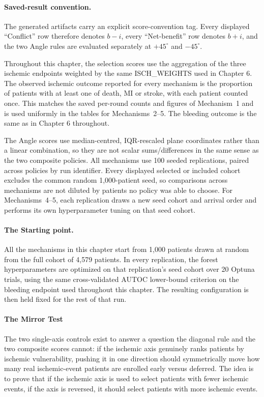 \paragraph{Saved-result convention.}
The generated artifacts carry an explicit score-convention tag. Every displayed
``Conflict'' row therefore denotes $b-i$, every ``Net-benefit'' row denotes $b+i$, and
the two Angle rules are evaluated separately at $+45^\circ$ and $-45^\circ$.

Throughout this chapter, the selection scores use the aggregation of the three
ischemic endpoints weighted by the same ISCH\_WEIGHTS used in Chapter 6. The observed
ischemic outcome reported for every mechanism is the proportion of patients with at
least one of death, MI or stroke, with each patient counted once. This matches the saved
per-round counts and figures of Mechanism~1 and is used uniformly in the tables for
Mechanisms~2--5. The bleeding outcome is the same as in Chapter 6 throughout.

\vspace{10pt}

The Angle scores use median-centred, IQR-rescaled plane coordinates rather than a
linear combination, so they are not scalar sums/differences in the same sense as the two
composite policies.
All mechanisms use 100 seeded replications, paired across policies by run identifier.
Every displayed selected or included cohort excludes the common random 1,000-patient seed,
so comparisons across mechanisms are not diluted by patients no policy was able to choose.
For Mechanisms~4--5, each replication draws a new seed cohort and arrival order and
performs its own hyperparameter tuning on that seed cohort.

\paragraph{The Starting point.}
All the mechanisms in this chapter start from 1,000 patients drawn at random from the
full cohort of 4,579 patients. In every replication, the forest hyperparameters are
optimized on that replication's seed cohort over 20 Optuna trials, using the same
cross-validated AUTOC lower-bound criterion on the bleeding endpoint used throughout
this chapter. The resulting configuration is then held fixed for the rest of that run.

\paragraph{The Mirror Test}
The two single-axis controls exist to answer a question the diagonal rule and the two
composite scores cannot: if the ischemic axis genuinely ranks patients by ischemic
vulnerability, pushing it in one direction should symmetrically move how many real
ischemic-event patients are enrolled early versus deferred. The idea is to prove that if
the ischemic axis is used to select patients with fewer ischemic events, if the axis is reversed,
it should select patients with more ischemic events.

